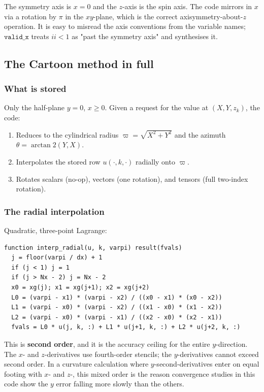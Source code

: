 \gotcha
The symmetry axis is $x=0$ and the $z$-axis is the spin axis. The code mirrors
in $x$ via a rotation by $\pi$ in the $xy$-plane, which is the correct
axisymmetry-about-$z$ operation. It is easy to misread the axis conventions
from the variable names; $\texttt{valid\_x}$ treats $ii < 1$ as "past the
symmetry axis" and synthesises it.

\subsection{The Cartoon method in full}

\subsubsection{What is stored}

Only the half-plane $y = 0$, $x \geq 0$. Given a request for the value at
$(X, Y, z_k)$, the code:
\begin{enumerate}
\item Reduces to the cylindrical radius
      $\varpi = \sqrt{X^2 + Y^2}$ and the azimuth
      $\theta = \arctan2(Y, X)$.
\item Interpolates the stored row $u(\cdot, k, \cdot)$ radially onto $\varpi$.
\item Rotates scalars (no-op), vectors (one rotation), and tensors (full
      two-index rotation).
\end{enumerate}

\subsubsection{The radial interpolation}

Quadratic, three-point Lagrange:
\begin{lstlisting}
function interp_radial(u, k, varpi) result(fvals)
  j = floor(varpi / dx) + 1
  if (j < 1) j = 1
  if (j > Nx - 2) j = Nx - 2
  x0 = xg(j); x1 = xg(j+1); x2 = xg(j+2)
  L0 = (varpi - x1) * (varpi - x2) / ((x0 - x1) * (x0 - x2))
  L1 = (varpi - x0) * (varpi - x2) / ((x1 - x0) * (x1 - x2))
  L2 = (varpi - x0) * (varpi - x1) / ((x2 - x0) * (x2 - x1))
  fvals = L0 * u(j, k, :) + L1 * u(j+1, k, :) + L2 * u(j+2, k, :)
\end{lstlisting}

\gotcha
This is \textbf{second order}, and it is the accuracy ceiling for the entire
$y$-direction. The $x$- and $z$-derivatives use fourth-order stencils; the
$y$-derivatives cannot exceed second order. In a curvature calculation where
$y$-second-derivatives enter on equal footing with $x$- and $z$-, this mixed
order is the reason convergence studies in this code show the $y$ error
falling more slowly than the others.

